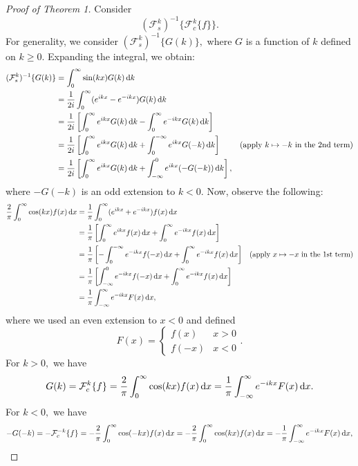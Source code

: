 \documentclass[10pt,reqno,oneside,a4paper]{article}
\begin{document}
\begin{proof}[Proof of Theorem 1]
Consider
\[ 
(\mathcal{F}^k_s)^{-1} \{ \mathcal{F}^k_c \{ f \} \}.
\]
For generality, we consider $(\mathcal{F}^k_s)^{-1} \{ G(k) \},$ where $G$ is a function of $k$ defined on $k\geq 0.$ Expanding the integral, we obtain:
\begin{align*}
(\mathcal{F}^k_s)^{-1} \{ G(k) \} &= \int^{\infty}_0 \sin(kx) G(k) \,\mathrm{d} k \\
&= \frac{1}{2i} \int^{\infty}_0 (e^{ikx} - e^{-ikx}) G(k) \,\mathrm{d} k \\
&= \frac{1}{2i} \left[ \int^{\infty}_0 e^{ikx} G(k) \,\mathrm{d} k - \int^{\infty}_0 e^{-ikx} G(k) \,\mathrm{d} k\right] \\
&= \frac{1}{2i} \left[ \int^{\infty}_0 e^{ikx} G(k) \,\mathrm{d} k + \int^{-\infty}_0 e^{ikx} G(-k) \,\mathrm{d} k\right] &\text{(apply $k \mapsto - k$ in the 2nd term)} \\
&= \frac{1}{2i} \left[ \int^{\infty}_0 e^{ikx} G(k) \,\mathrm{d} k + \int_{-\infty}^0 e^{ikx} (-G(-k)) \,\mathrm{d} k\right],
\end{align*}
where $-G(-k)$ is an odd extension to $k<0$. Now, observe the following:
\begin{align*}
\frac{2}{\pi} \int^{\infty}_0 \cos(kx) f(x) \,\mathrm{d} x &=\frac{1}{\pi} \int^{\infty}_0 (e^{ikx} + e^{-ikx}) f(x) \,\mathrm{d} x \\
&= \frac{1}{\pi} \left[ \int^{\infty}_0 e^{ikx} f(x) \,\mathrm{d} x + \int^{\infty}_0 e^{-ikx} f(x) \,\mathrm{d} x \right] \\
&= \frac{1}{\pi} \left[ -\int^{-\infty}_0 e^{-ikx} f(-x) \,\mathrm{d} x  + \int^{\infty}_0 e^{-ikx} f(x) \,\mathrm{d} x  \right] &\text{(apply $x \mapsto - x$ in the 1st term)} \\
&= \frac{1}{\pi} \left[ \int_{-\infty}^0 e^{-ikx} f(-x) \,\mathrm{d} x  + \int^{\infty}_0 e^{-ikx} f(x) \,\mathrm{d} x \right] \\
&= \frac{1}{\pi} \int_{-\infty}^\infty e^{-ikx} F(x) \,\mathrm{d} x, 
\end{align*}
where we used an even extension to $x<0$ and defined
\[ 
F(x) = \begin{cases} f(x) & x>0 \\ f(-x) & x<0 \end{cases}.
\]
For $k>0,$ we have
\begin{equation}\label{G(k)}
G(k) = \mathcal{F}^k_c \{ f \} = \frac{2}{\pi} \int^{\infty}_0 \cos(kx) f(x) \,\mathrm{d} x = \frac{1}{\pi} \int_{-\infty}^\infty e^{-ikx} F(x) \,\mathrm{d} x.
\end{equation}
For $k<0,$ we have 
\begin{equation}\label{-G(-k)}
-G(- k) = - \mathcal{F}^{-k}_c \{ f \}  = -\frac{2}{\pi} \int^{\infty}_0 \cos(-kx) f(x) \D x =-\frac{2}{\pi} \int^{\infty}_0 \cos(kx) f(x) \D x = - \frac{1}{\pi} \int_{-\infty}^\infty e^{-ikx} F(x) \D x, 

\end{equation}
\end{proof}
\end{document}
